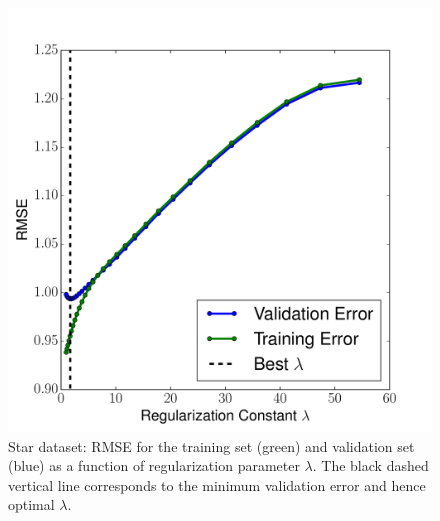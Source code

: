\documentclass[12pt]{amsart}
\begin{document}
\begin{figure}
	\includegraphics[width=\columnwidth]{star_rmse.pdf}
    \caption{Star dataset: RMSE for the training set (green) and validation set (blue) as a function of regularization parameter $\lambda$.  The black dashed vertical line corresponds to the minimum validation error and hence optimal $\lambda$.}
    \label{fig:yelp_star_rmse}
\end{figure}
\end{document}
